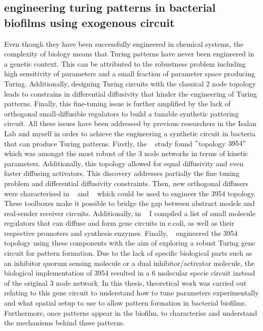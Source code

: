 \subsection{engineering turing patterns in bacterial biofilms using exogenous circuit }
Even though they have been successfully engineered in chemical systems, the complexity of biology means that Turing patterns have never been engineered in a genetic context.
This can be attributed to the robustness problem including high sensitivity of parameters and a small fraction of parameter space producing Turing.
Additionally, designing Turing circuits with the classical 2 node topology leads to constrains in differential diffusivity that hinder the engineering of Turing patterns.
Finally, this fine-tuning issue is further amplified by the lack of orthogonal small-diffusible regulators to build a tunable synthetic pattering circuit.
All these issues have been addressed by previous researchers in the Isalan Lab and myself in order to achieve the engineering a synthetic circuit in bacteria that can produce Turing patterns.
Firstly, the ~\cite{Scholes2019} study found \("\)topology \(3954"\) which was amongst the most robust of the 3 node networks in terms of kinetic parameters.
Additionally, this topology allowed for equal diffusivity and even faster diffusing activators.
This discovery addresses partially the fine tuning problem and differential diffusivity constraints.
Then, new orthogonal diffusers were characterised in ~\cite{Meyer2019} and ~\cite{Du2020} which could be used to engineer the 3954 topology.
These toolboxes make it possible to bridge the gap between abstract models and real-sender receiver circuits.
Additionally, in ~\cite{huidobro} I compiled a list of small molecule regulators that can diffuse and form gene circuits in e.coli, as well as their respective promoters and synthesis enzymes.
Finally, ~\cite{Tica2020} engineered the 3954 topology using these components with the aim of exploring a robust Turing gene circuit for pattern formation.
Due to the lack of specific biological parts such as an inhibitor quorum sensing molecule or a dual inhibitor/activator molecule, the biological implementation of 3954 resulted in a 6 molecular specie circuit instead of the original 3 node network. %
In this thesis, theoretical work was carried out relating to this gene circuit to understand how to tune parameters experimentally and what spatial setup to use to allow pattern formation in bacterial biofilms.
Furthermore, once patterns appear in the biofilm, to characterise and understand the mechanisms behind these patterns.
